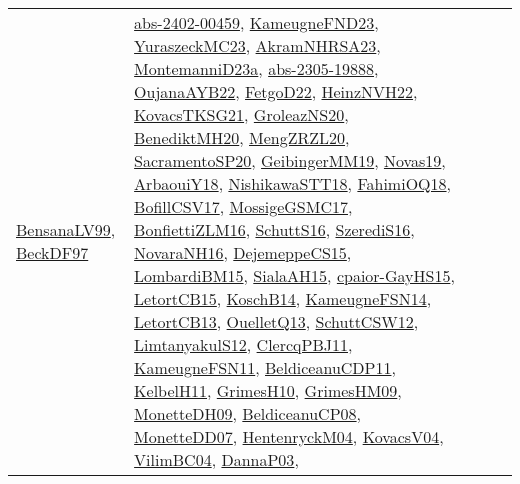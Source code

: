 {\begin{longtable}{lp{3cm}>{\raggedright}p{6cm}>{\raggedright}p{6cm}p{8cm}}
\href{articles/BensanaLV99.pdf}{BensanaLV99}\cite{BensanaLV99}, \href{papers/BeckDF97.pdf}{BeckDF97}\cite{BeckDF97} & \href{articles/abs-2402-00459.pdf}{abs-2402-00459}\cite{abs-2402-00459}, \href{papers/KameugneFND23.pdf}{KameugneFND23}\cite{KameugneFND23}, \href{papers/YuraszeckMC23.pdf}{YuraszeckMC23}\cite{YuraszeckMC23}, \href{articles/AkramNHRSA23.pdf}{AkramNHRSA23}\cite{AkramNHRSA23}, \href{articles/MontemanniD23a.pdf}{MontemanniD23a}\cite{MontemanniD23a}, \href{articles/abs-2305-19888.pdf}{abs-2305-19888}\cite{abs-2305-19888}, \href{papers/OujanaAYB22.pdf}{OujanaAYB22}\cite{OujanaAYB22}, \href{articles/FetgoD22.pdf}{FetgoD22}\cite{FetgoD22}, \href{articles/HeinzNVH22.pdf}{HeinzNVH22}\cite{HeinzNVH22}, \href{papers/KovacsTKSG21.pdf}{KovacsTKSG21}\cite{KovacsTKSG21}, \href{papers/GroleazNS20.pdf}{GroleazNS20}\cite{GroleazNS20}, \href{articles/BenediktMH20.pdf}{BenediktMH20}\cite{BenediktMH20}, \href{articles/MengZRZL20.pdf}{MengZRZL20}\cite{MengZRZL20}, \href{articles/SacramentoSP20.pdf}{SacramentoSP20}\cite{SacramentoSP20}, \href{papers/GeibingerMM19.pdf}{GeibingerMM19}\cite{GeibingerMM19}, \href{articles/Novas19.pdf}{Novas19}\cite{Novas19}, \href{papers/ArbaouiY18.pdf}{ArbaouiY18}\cite{ArbaouiY18}, \href{papers/NishikawaSTT18.pdf}{NishikawaSTT18}\cite{NishikawaSTT18}, \href{articles/FahimiOQ18.pdf}{FahimiOQ18}\cite{FahimiOQ18}, \href{papers/BofillCSV17.pdf}{BofillCSV17}\cite{BofillCSV17}, \href{papers/MossigeGSMC17.pdf}{MossigeGSMC17}\cite{MossigeGSMC17}, \href{papers/BonfiettiZLM16.pdf}{BonfiettiZLM16}\cite{BonfiettiZLM16}, \href{papers/SchuttS16.pdf}{SchuttS16}\cite{SchuttS16}, \href{papers/SzerediS16.pdf}{SzerediS16}\cite{SzerediS16}, \href{articles/NovaraNH16.pdf}{NovaraNH16}\cite{NovaraNH16}, \href{papers/DejemeppeCS15.pdf}{DejemeppeCS15}\cite{DejemeppeCS15}, \href{papers/LombardiBM15.pdf}{LombardiBM15}\cite{LombardiBM15}, \href{papers/SialaAH15.pdf}{SialaAH15}\cite{SialaAH15}, \href{papers/cpaior-GayHS15.pdf}{cpaior-GayHS15}\cite{cpaior-GayHS15}, \href{articles/LetortCB15.pdf}{LetortCB15}\cite{LetortCB15}, \href{papers/KoschB14.pdf}{KoschB14}\cite{KoschB14}, \href{articles/KameugneFSN14.pdf}{KameugneFSN14}\cite{KameugneFSN14}, \href{papers/LetortCB13.pdf}{LetortCB13}\cite{LetortCB13}, \href{papers/OuelletQ13.pdf}{OuelletQ13}\cite{OuelletQ13}, \href{papers/SchuttCSW12.pdf}{SchuttCSW12}\cite{SchuttCSW12}, \href{articles/LimtanyakulS12.pdf}{LimtanyakulS12}\cite{LimtanyakulS12}, \href{papers/ClercqPBJ11.pdf}{ClercqPBJ11}\cite{ClercqPBJ11}, \href{papers/KameugneFSN11.pdf}{KameugneFSN11}\cite{KameugneFSN11}, \href{articles/BeldiceanuCDP11.pdf}{BeldiceanuCDP11}\cite{BeldiceanuCDP11}, \href{articles/KelbelH11.pdf}{KelbelH11}\cite{KelbelH11}, \href{papers/GrimesH10.pdf}{GrimesH10}\cite{GrimesH10}, \href{papers/GrimesHM09.pdf}{GrimesHM09}\cite{GrimesHM09}, \href{papers/MonetteDH09.pdf}{MonetteDH09}\cite{MonetteDH09}, \href{papers/BeldiceanuCP08.pdf}{BeldiceanuCP08}\cite{BeldiceanuCP08}, \href{papers/MonetteDD07.pdf}{MonetteDD07}\cite{MonetteDD07}, \href{papers/HentenryckM04.pdf}{HentenryckM04}\cite{HentenryckM04}, \href{papers/KovacsV04.pdf}{KovacsV04}\cite{KovacsV04}, \href{papers/VilimBC04.pdf}{VilimBC04}\cite{VilimBC04}, \href{papers/DannaP03.pdf}{DannaP03}\cite{DannaP03}, 
\end{longtable}}
